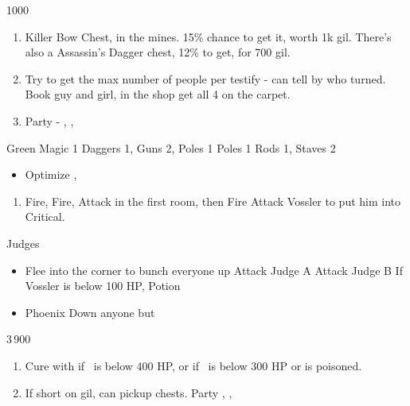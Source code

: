 \begin{shop}{1000}
\end{shop}
\begin{enumerate}
	\item Killer Bow Chest, in the mines. 15\% chance to get it, worth 1k gil. There's also a Assassin's Dagger chest, 12\% to get, for 700 gil.
	\item Try to get the max number of people per testify - can tell by who turned. Book guy and girl, in the shop get all 4 on the carpet.
	\item Party - \vaan, \balthier, \basch
\end{enumerate}
\begin{liscense}
	\begin{itemize}
		\vaanf Green Magic 1
		\baschf Daggers 1, Guns 2, Poles 1
		\balthierf Poles 1
		\baschf Rods 1, Staves 2
	\end{itemize}
\end{liscense}
\begin{equip}
	\begin{itemize}
		\item Optimize \basch, \vaan
	\end{itemize}
\end{equip}
\begin{enumerate}
	\item Fire, Fire, Attack in the first room, then Fire Attack Vossler to put him into Critical.
\end{enumerate}
\begin{battle}{Judges}
	\begin{itemize}
		\item Flee into the corner to bunch everyone up
		      \vaanf Attack Judge A
		      \baschf Attack Judge B
		      \balthierf If Vossler is below 100 HP, Potion
		\item Phoenix Down anyone but \balthier
	\end{itemize}
\end{battle}
\begin{shop}{3\,900}
\end{shop}
\begin{enumerate}
	\item Cure with \balthier if \basch\ is below 400 HP, or if \vaan\ is below 300 HP or is poisoned.
	\item If short on gil, can pickup chests. Party \vaan, \penelo, \ashe
\end{enumerate}
